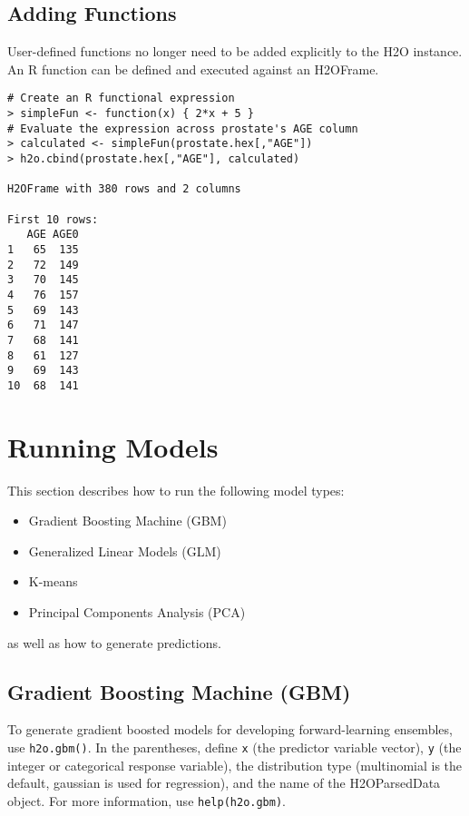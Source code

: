 {{\subsection{Adding Functions}


User-defined functions no longer need to be added explicitly to the H2O instance. An R function can be defined and executed against an H2OFrame.

\waterExampleInR
\medskip
\begin{lstlisting}[style=R]
# Create an R functional expression
> simpleFun <- function(x) { 2*x + 5 }
# Evaluate the expression across prostate's AGE column
> calculated <- simpleFun(prostate.hex[,"AGE"])
> h2o.cbind(prostate.hex[,"AGE"], calculated)

H2OFrame with 380 rows and 2 columns

First 10 rows:
   AGE AGE0
1   65  135
2   72  149
3   70  145
4   76  157
5   69  143
6   71  147
7   68  141
8   61  127
9   69  143
10  68  141
\end{lstlisting}

\section{Running Models}
\label{sec:RunModel}

This section describes how to run the following model types:

\begin{itemize}
\item Gradient Boosting Machine (GBM)
\item Generalized Linear Models (GLM)
\item K-means
\item Principal Components Analysis (PCA)

\end{itemize}
as well as how to generate predictions.


\subsection{Gradient Boosting Machine (GBM)}

To generate gradient boosted models for developing forward-learning ensembles, use {\texttt{h2o.gbm()}}.  In the parentheses, define \texttt{x} (the predictor variable vector), \texttt{y} (the integer or categorical response variable), the distribution type (multinomial is the default, gaussian is used for regression), and the name of the H2OParsedData object.
For more information, use {\texttt{help(h2o.gbm)}}.

}}
